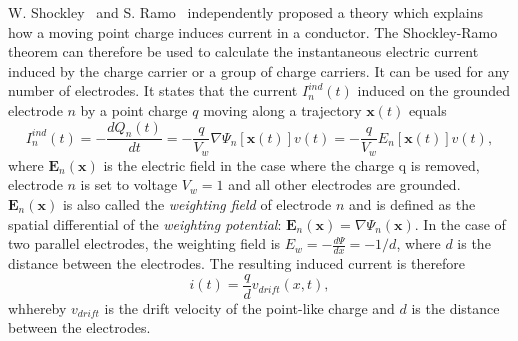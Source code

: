 \documentclass[12pt]{mytustyle}  %
\begin{document}
W. Shockley~\cite{SHOCKLEY:00000} and S. Ramo~\cite{RAMO:00000} independently proposed a theory which explains how a moving point charge induces current in a conductor. The Shockley-Ramo theorem can therefore be used to calculate the instantaneous electric current induced by the charge carrier or a group of charge carriers. It can be used for any number of electrodes. It states that the current $I_n^{ind}(t)$ induced on the grounded electrode $n$ by a point charge $q$ moving along a trajectory $\textbf{x}(t)$ equals
\begin{equation}
\label{eq:ramo}
I_n^{ind}(t) = -\frac{dQ_n(t)}{dt} =  -\frac{q}{V_w}\nabla\Psi_n[\textbf{x}(t)]v(t)  =  -\frac{q}{V_w}E_n[\textbf{x}(t)]v(t),
\end{equation}
where $\textbf{E}_n(\textbf{x})$ is the electric field in the case where the charge q is removed, electrode $n$ is  set to voltage $V_w=1$ and all other electrodes are grounded. $\textbf{E}_n(\textbf{x})$ is also called the \emph{weighting field} of electrode $n$ and is defined as the spatial differential of the \emph{weighting potential}: $\textbf{E}_n(\textbf{x})=\nabla \Psi_n(\textbf{x})$. In the case of two parallel electrodes, the weighting field is $E_w = -\frac{d\Psi}{dx} = -1/d$, where $d$ is the distance between the electrodes. The resulting induced current is therefore
\begin{equation}
\label{eq:ramoparallel}
i(t) = \frac{q}{d}v_{drift}(x,t),
\end{equation} 
whhereby $v_{drift}$ is the drift velocity of the point-like charge and $d$ is the distance between the electrodes.






\end{document}
